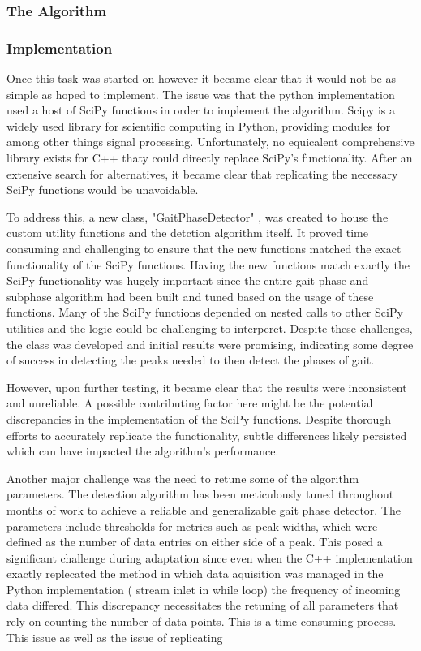 \subsubsection{The Algorithm}

\subsubsection{Implementation}

Once this task was started on however it became clear that it would not be as simple as hoped to implement. The issue was that the python implementation used a host of SciPy \cite{noauthor_scipy_nodate} functions in order to implement the algorithm. Scipy is a  widely used library for scientific computing in Python, providing modules for among other things signal processing. Unfortunately, no equicalent comprehensive library exists for C++ thaty could directly replace SciPy's functionality. After an extensive search for alternatives, it became clear that replicating the necessary SciPy functions would be unavoidable.

To address this, a new class, "GaitPhaseDetector" , was created to house the custom utility functions and the detction algorithm itself. It proved time consuming and challenging to ensure that the new functions matched the exact functionality of the SciPy functions. Having the new functions match exactly the SciPy functionality was hugely important since the entire gait phase and subphase algorithm had been built and tuned based on the usage of these functions. Many of the SciPy functions depended on nested calls to other SciPy utilities and the logic could be challenging to interperet. Despite these challenges, the class was developed and initial results were promising, indicating some degree of success in detecting the peaks needed to then detect the phases of gait. 


However, upon further testing, it became clear that the results were inconsistent and unreliable. A possible contributing factor here might be the potential discrepancies in the implementation of the SciPy functions. Despite thorough efforts to accurately replicate the functionality, subtle differences likely persisted which can have impacted the algorithm's performance. 

Another major challenge was the need to retune some of the algorithm parameters. The detection algorithm has been meticulously tuned throughout months of work to achieve a reliable and generalizable gait phase detector. The parameters include thresholds for metrics such as peak widths, which were defined as the number of data entries on either side of a peak. This posed  a significant challenge during adaptation since even when the C++ implementation exactly replecated the method in which data aquisition was managed in the Python implementation ( stream inlet in while loop) the frequency of incoming data differed. This discrepancy necessitates the retuning of all parameters that rely on counting the number of data points. This is a time consuming process. This issue as well as the issue of replicating 

